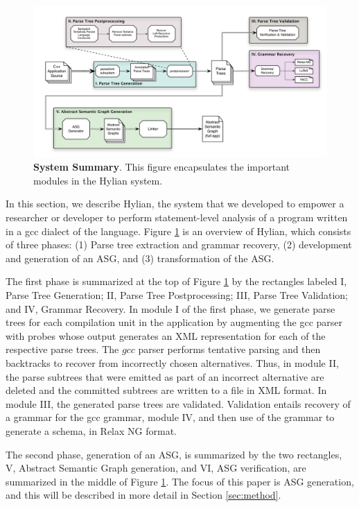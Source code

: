 

\begin{figure}[t]
\centerline{\includegraphics[scale=0.65]{figures/overview_acmse}}
\caption{{\bf \large System Summary}. This figure encapsulates the
important modules in the Hylian system.}
\label{fig:overview}
\figline
\end{figure}


In this section, we describe Hylian, the system that we developed
to empower a researcher or developer to perform statement-level 
analysis of a program written in a gcc dialect of the {\CPP} language.
Figure \ref{fig:overview} is an overview of Hylian, which
consists of three phases: (1) Parse tree extraction and grammar
recovery, (2) development and generation of an ASG, and 
(3) transformation of the ASG.


The first phase is summarized at the top of Figure \ref{fig:overview} 
by the rectangles labeled 
I, {\sf Parse Tree Generation}; 
II, {\sf Parse Tree Postprocessing};
III, {\sf Parse Tree Validation};
and IV, {\sf Grammar Recovery}.
In module I of the first phase, we generate parse trees for each 
compilation unit in the application by augmenting the 
gcc {\CPP} parser with probes whose output generates
an XML representation for each of the respective parse trees.
The $gcc$ parser performs tentative parsing and then
backtracks to recover from incorrectly chosen alternatives. 
Thus, in module II, the parse subtrees that were emitted as part 
of an incorrect alternative are deleted and the committed subtrees 
are written to a file in XML format.
In module III, the generated parse trees are validated.
Validation entails recovery of a grammar for the gcc
{\CPP} grammar, module IV, and then use of the grammar to 
generate a schema, in Relax NG format.

The second phase, generation of an ASG, is summarized by
the two rectangles, V, {\sf Abstract Semantic Graph generation},
and VI, {\sf ASG verification}, are summarized in the middle
of Figure \ref{fig:overview}.
The focus of this paper is ASG generation, and this will
be described in more detail in Section \ref{sec:method}.


